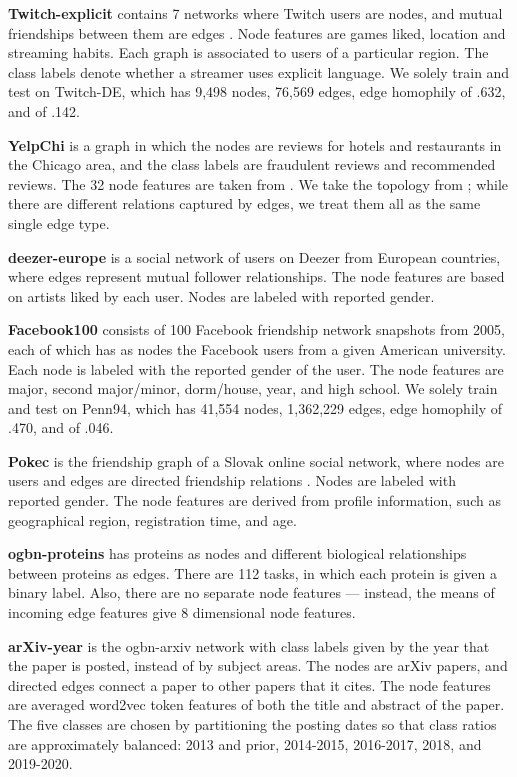 \documentclass[sigconf, balance=false]{acmart}
\newcommand{\myparagraph}[1]{\smallskip \noindent \textbf{#1}}
\begin{document}
\myparagraph{Twitch-explicit} contains 7 networks where Twitch users are nodes, and mutual friendships between them are edges \cite{rozemberczki2019multi}. Node features are games liked, location and streaming habits. Each graph is associated to users of a particular region. The class labels denote whether a streamer uses explicit language. We solely train and test on Twitch-DE, which has 9,498 nodes, 76,569 edges, edge homophily of .632, and   of .142.
    
\myparagraph{YelpChi} \cite{mukherjee2013yelp} is a graph in which the nodes are reviews for hotels and restaurants in the Chicago area, and the class labels are fraudulent reviews and recommended reviews. The 32 node features are taken from \cite{rayana2015collective}. We take the topology from \cite{dou2020enhancing};  while there are different relations captured by edges, we treat them all as the same single edge type.


\myparagraph{deezer-europe} \cite{rozemberczki2020characteristic} is a social network of users on Deezer from European countries, where edges represent mutual follower relationships. The node features are based on artists liked by each user. Nodes are labeled with reported gender.

\myparagraph{Facebook100} \cite{traud2012social} consists of 100 Facebook friendship network snapshots from 2005, each of which has as nodes the Facebook users from a given American university. Each node is labeled with the reported gender of the user. The node features are major, second major/minor, dorm/house, year, and high school. We solely train and test on Penn94, which has 41,554 nodes, 1,362,229 edges, edge homophily of .470, and  of .046.

\myparagraph{Pokec} is the friendship graph of a Slovak online social network, where nodes are users and edges are directed friendship relations \cite{snapnets}. Nodes are labeled with reported gender. The node features are derived from profile information, such as geographical region, registration time, and age.

\myparagraph{ogbn-proteins} \cite{hu2020open} has proteins as nodes and different biological relationships between proteins as edges. There are 112 tasks, in which each protein is given a binary label. Also, there are no separate node features --- instead, the means of incoming edge features give 8 dimensional node features.

\myparagraph{arXiv-year} \cite{hu2020open} is the ogbn-arxiv network with class labels given by the year that the paper is posted, instead of by subject areas. The nodes are arXiv papers, and directed edges connect a paper to other papers that it cites. The node features are averaged word2vec token features of both the title and abstract of the paper. The five classes are chosen by partitioning the posting dates so that class ratios are approximately balanced: 2013 and prior, 2014-2015, 2016-2017, 2018, and 2019-2020.
\end{document}
